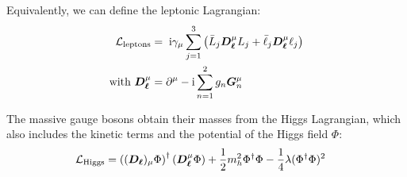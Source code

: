 \documentclass[preprint,3p,12pt]{elsarticle}
\begin{document}
Equivalently, we can define the leptonic Lagrangian:
\begin{align*}
{\cal L}_{\rm leptons} & = \; {\rm i}\gamma _\mu \sum\limits_{j=1}^3 \left( \bar{L}_j \bm{D_\ell}^\mu L_j + \bar{\ell}_j \bm{D_\ell}^\mu \ell _j \right) \\
\text{with } \bm{D_\ell}^\mu & = \partial ^\mu -{\rm i}\sum\limits_{n=1}^2 g_n \bm{G}_n^\mu
\end{align*}

The massive gauge bosons obtain their masses from the Higgs Lagrangian, which also includes the kinetic terms and the potential of the Higgs field $\Phi$:
\begin{align*}
{\cal L}_{\rm Higgs} & = \left( (\bm{D_\ell})_\mu \Phi \right) ^\dagger \left( \bm{D_\ell}^\mu \Phi \right) +\frac12 m_h^2 \Phi ^\dagger \Phi -\frac14 \lambda (\Phi ^\dagger \Phi )^2 
\end{align*}
\end{document}
